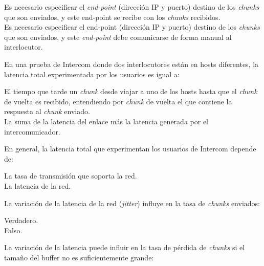 \documentclass[legalpaper, 12pt, addpoints]{exam}
\begin{document}
\begin{questions}
\begin{oneparchoices}
  \choice Es necesario especificar el \emph{end-point} (dirección IP y puerto) destino de los \emph{chunks} que son enviados, y este end-point se recibe con los \emph{chunks} recibidos.\\
  \choice Es necesario especificar el end-point (dirección IP y puerto) destino de los \emph{chunks} que son enviados, y este \emph{end-point} debe comunicarse de forma manual al interlocutor.
\end{oneparchoices}

\vspace{0.10in}

\question En una prueba de Intercom donde dos interlocutores están en
hosts diferentes, la latencia total experimentada por los usuarios es
igual a:

\begin{oneparchoices}
  \choice El tiempo que tarde un \emph{chunk} desde viajar a uno de los hosts hasta que el \emph{chunk} de vuelta es recibido, entendiendo por \emph{chunk} de vuelta el que contiene la respuesta al \emph{chunk} enviado.\\
  \choice La suma de la latencia del enlace más la latencia generada por el intercomunicador.
\end{oneparchoices}
  
\vspace{0.10in}

\question En general, la latencia total que experimentan los usuarios
de Intercom depende de:

\begin{oneparchoices}
  \choice La tasa de transmisión que soporta la red.\\
  \choice La latencia de la red.
\end{oneparchoices}
  
\vspace{0.10in}

\question La variación de la latencia de la red (\emph{jitter})
influye en la tasa de \emph{chunks} enviados:

\begin{oneparchoices}
  \choice Verdadero.\\
  \choice Falso.
\end{oneparchoices}
  
\vspace{0.10in}

\question La variación de la latencia puede influir en la tasa de
pérdida de \emph{chunks} si el tamaño del buffer no es suficientemente
grande:


\end{questions}
\end{document}
